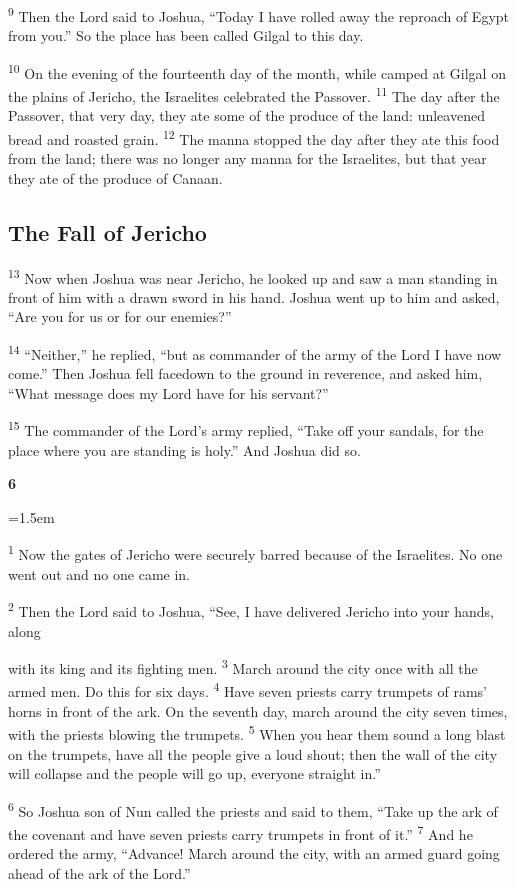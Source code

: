 \documentclass[12pt,twoside]{article}
\newcommand{\vs}[1]{\textsuperscript{#1}}
\newcommand{\chapterWithIndent}[2]{%
  \noindent
  \begin{minipage}[t]{1cm}
    \vspace{-0.4\baselineskip}
    {\fontsize{40pt}{48pt}\selectfont \textbf{#1}}
  \end{minipage}%
  \hspace{0.3cm}%
  \begin{minipage}[t]{\dimexpr\linewidth - 1.5cm - 0.3cm\relax}
    \hangindent=1.5em
    \hangafter=3
    #2
    \vspace{0.1cm}
  \end{minipage}
}
\begin{document}
\vs{9} Then the Lord said to Joshua, ``Today I have rolled away the reproach of Egypt from you.'' So the place has been called Gilgal to this day.

\vs{10} On the evening of the fourteenth day of the month, while camped at Gilgal on the plains of Jericho, the Israelites celebrated the Passover.
\vs{11} The day after the Passover, that very day, they ate some of the produce of the land: unleavened bread and roasted grain.
\vs{12} The manna stopped the day after they ate this food from the land; there was no longer any manna for the Israelites, but that year they ate of the produce of Canaan.

\subsection*{\textbf{The Fall of Jericho}}

\vs{13} Now when Joshua was near Jericho, he looked up and saw a man standing in front of him with a drawn sword in his hand. Joshua went up to him and asked, ``Are you for us or for our enemies?''

\vs{14} ``Neither,'' he replied, ``but as commander of the army of the Lord I have now come.'' Then Joshua fell facedown to the ground in reverence, and asked him, ``What message does my Lord have for his servant?''

\vs{15} The commander of the Lord's army replied, ``Take off your sandals, for the place where you are standing is holy.'' And Joshua did so.

\chapterWithIndent{6}{
  \vs{1} Now the gates of Jericho were securely barred because of the Israelites. No one went out and no one came in.

  \vs{2} Then the Lord said to Joshua, ``See, I have delivered Jericho into your hands, along
}

\noindent with its king and its fighting men.
\vs{3} March around the city once with all the armed men. Do this for six days.
\vs{4} Have seven priests carry trumpets of rams' horns in front of the ark. On the seventh day, march around the city seven times, with the priests blowing the trumpets.
\vs{5} When you hear them sound a long blast on the trumpets, have all the people give a loud shout; then the wall of the city will collapse and the people will go up, everyone straight in.''

\vs{6} So Joshua son of Nun called the priests and said to them, ``Take up the ark of the covenant and have seven priests carry trumpets in front of it.''
\vs{7} And he ordered the army, ``Advance! March around the city, with an armed guard going ahead of the ark of the Lord.''
\end{document}
